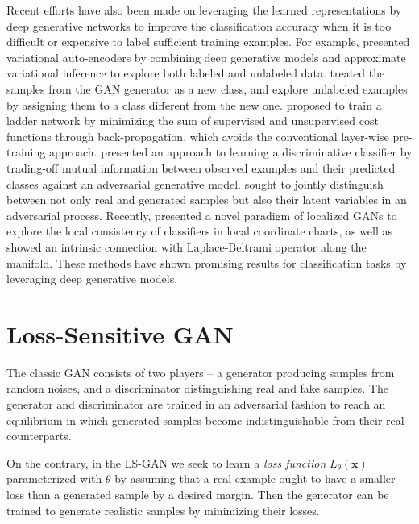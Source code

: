 \documentclass[11pt,fullpage, letterpaper,twoside]{article}
\newcommand{\1}[1]{\mathds{1}_{\left[#1\right]}}
\begin{document}
Recent efforts have also been made on leveraging the learned representations by deep generative networks to improve the classification accuracy when it is too difficult or expensive to label sufficient training examples.  For example, \cite{kingma2014semi} presented variational auto-encoders \cite{kingma2013auto} by combining deep generative models and approximate variational inference to explore both labeled and unlabeled data.
\cite{salimans2016improved} treated the samples from the GAN generator as a new class, and explore unlabeled examples by assigning them to a class different from the new one. \cite{rasmus2015semi} proposed to train a ladder network \cite{valpola2015neural} by minimizing the sum of supervised and unsupervised cost functions through back-propagation, which avoids the conventional layer-wise pre-training approach. \cite{springenberg2015unsupervised} presented an approach to learning a discriminative classifier by trading-off mutual information between observed examples and their predicted classes against an adversarial generative model. \cite{dumoulin2016adversarially} sought to jointly distinguish between not only real and generated samples but also their latent variables in an adversarial process. Recently, \cite{qi2017global} presented a novel paradigm of localized GANs to explore the local consistency of classifiers in local coordinate charts, as well as showed an intrinsic connection with Laplace-Beltrami operator along the manifold. These methods have shown promising results for classification tasks by leveraging deep generative models.





\section{Loss-Sensitive GAN}\label{sec:lsgan}
The classic GAN consists of two players -- a generator producing samples from random noises,
and a discriminator distinguishing real and fake samples. The generator and discriminator are trained in an adversarial fashion to reach an equilibrium in which generated samples become indistinguishable from their real counterparts.



On the contrary, in the LS-GAN we seek to learn a {\em loss function} $L_\theta(\mathbf x)$ parameterized with $\theta$ by assuming that a real example ought to have a smaller loss than a generated sample by a desired margin. Then the generator
can be trained to generate realistic samples by minimizing their losses.
\end{document}
